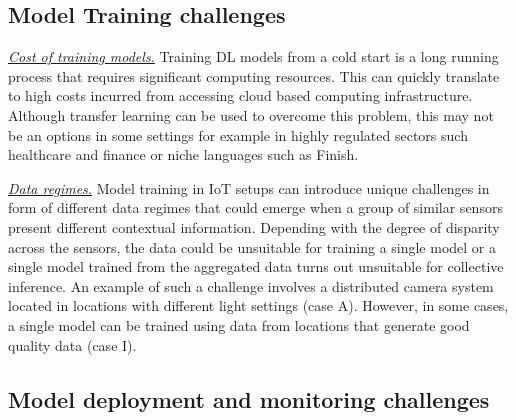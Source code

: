 \subsection{Model Training challenges}

\underline{\emph{Cost of training models.}} Training DL models from a cold start is a long running process that requires significant computing resources. This can quickly translate to high costs incurred from accessing cloud based computing infrastructure. Although transfer learning can be used to overcome this problem, this may not be an options in some settings for example in highly regulated sectors such healthcare and finance or niche languages such as Finish. %

\underline{\emph{Data regimes.}} Model training in IoT setups can introduce unique challenges in form of different data regimes that could emerge when a group of similar sensors present different contextual information. Depending with the degree of disparity across the sensors, the data could be unsuitable for training a single model or a single model trained from the aggregated data turns out unsuitable for collective inference. An example of such a challenge involves a distributed camera system located in locations with different light settings (case A). However, in some cases, a single model can be trained using data from locations that generate good quality data (case I).



\subsection{Model deployment and monitoring challenges}

